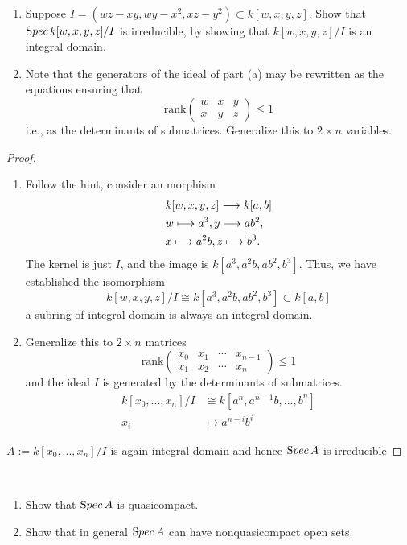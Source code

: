 \documentclass[11pt,fleqn]{book}
\begin{document}
\begin{exr}\ 
\begin{enumerate}[label=(\alph*)]
	\item 
Suppose $I = (wz-xy, wy-x^2 , xz-y^2 ) \subset k[w, x, y, z]$. Show that ${\text Spec\,} k[w, x, y, z]/I$ is irreducible, by showing that $k[w, x, y, z]/I$ is an integral domain.
\item Note that the generators of the ideal of part (a) may be rewritten as the equations ensuring that
$$
\text{rank}
\begin{pmatrix}
w & x & y\\
x & y & z
\end{pmatrix}
\leq 1
$$
i.e., as the determinants of submatrices. Generalize this to $2\times n$ variables.
\end{enumerate}
\end{exr}
\begin{proof}
\begin{enumerate}[label=(\alph*)]
	\item 
Follow the hint, consider an morphism
$$
\begin{aligned}
&k[w,x,y,z]\longrightarrow k[a,b] \\
& w\longmapsto a^3, y\longmapsto ab^2,\\
& x\longmapsto a^2b, z\longmapsto b^3.\\
\end{aligned}
$$
The kernel is just $I$, and the image is $k[a^3,a^2b, ab^2,b^3]$. Thus, we have established the isomorphism
$$
k[w,x,y,z]/I\cong k[a^3,a^2b, ab^2,b^3]\subset k[a,b]
$$
a subring of integral domain is always an integral domain.
\item Generalize this to $2\times n$ matrices
$$
\text{rank}
\begin{pmatrix}
x_0 & x_1 & \cdots &x_{n-1}\\
x_1 & x_2 & \cdots &x_{n}
\end{pmatrix}
\leq 1
$$
and the ideal $I$ is generated by the determinants of submatrices. 
$$
\begin{aligned}
k[x_0,...,x_{n}]/I&\cong k[a^n,a^{n-1}b,...,b^{n}]\\
x_i&\longmapsto a^{n-i}b^i
\end{aligned}
$$
\end{enumerate}
$A:=k[x_0,...,x_{n}]/I$ is again integral domain and hence ${\text Spec\,} A$ is irreducible

\end{proof}
\begin{exr}\ 
\begin{enumerate}[label=(\alph*)]
\item  Show that ${\text Spec\,} A$ is quasicompact.
\item Show that in general ${\text Spec\,} A$ can have nonquasicompact open sets.
\end{enumerate}
\end{exr}
\end{document}
